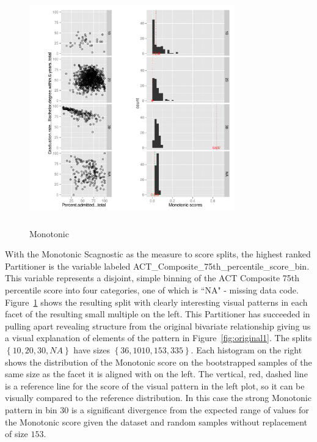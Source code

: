 \begin{figure}
\includegraphics[width=3.5in,height=4in]{images/15_8918450338241-ACT_Composite_75th_percentile_score_bin.pdf}
  \caption{Monotonic}
 \label{fig:monotonic1}
\end{figure}

With the Monotonic Scagnostic as the measure to score splits, the highest ranked Partitioner is the variable labeled ACT\_Composite\_75th\_percentile\_score\_bin. This variable represents a disjoint, simple binning of the ACT Composite 75th percentile score into four categories, one of which is ``NA" - missing data code. Figure~\ref{fig:monotonic1} shows the resulting split with clearly interesting visual patterns in each facet of the resulting small multiple on the left. This Partitioner has succeeded in pulling apart revealing structure from the original bivariate relationship giving us a visual explanation of elements of the pattern in Figure~\ref{fig:original1}. 
The splits $\left\{{10, 20, 30, NA}\right\}$ have sizes $\left\{{36, 1010, 153, 335}\right\}$. Each histogram on the right shows the distribution of the Monotonic score on the bootstrapped samples of the same size as the facet it is aligned with on the left. The vertical, red, dashed line is a reference line for the score of the visual pattern in the left plot, so it can be visually compared to the reference distribution. In this case the strong Monotonic pattern in bin $30$ is a significant divergence from the expected range of values for the Monotonic score given the dataset and random samples without replacement of size $153$.

